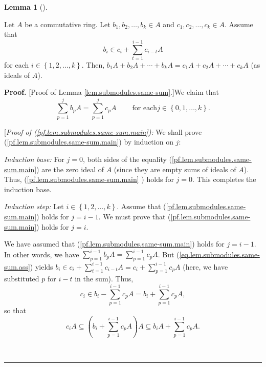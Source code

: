 \documentclass[numbers=enddot,12pt,final,onecolumn,notitlepage]{scrartcl}%
\theoremstyle{definition}
\newtheorem{lem}[theo]{Lemma}
\newenvironment{lemma}[1][]
{\begin{lem}[#1]\begin{leftbar}}
{\end{leftbar}\end{lem}}
\newenvironment{proof}[1][Proof]{\noindent\textbf{#1.} }{\ \rule{0.5em}{0.5em}}
\let\sumnonlimits\sum
\renewcommand{\sum}{\sumnonlimits\limits}
\begin{document}
\begin{lemma}
\label{lem.submodules.same-sum}Let $A$ be a commutative ring. Let $b_{1}%
,b_{2},\ldots,b_{k}\in A$ and $c_{1},c_{2},\ldots,c_{k}\in A$. Assume that
\begin{equation}
b_{i}\in c_{i}+\sum_{t=1}^{i-1}c_{i-t}A \label{eq.lem.submodules.same-sum.ass}%
\end{equation}
for each $i\in\left\{  1,2,\ldots,k\right\}  $. Then, $b_{1}A+b_{2}%
A+\cdots+b_{k}A=c_{1}A+c_{2}A+\cdots+c_{k}A$ (as ideals of $A$).
\end{lemma}

\begin{proof}
[Proof of Lemma \ref{lem.submodules.same-sum}.]We claim that%
\begin{equation}
\sum_{p=1}^{j}b_{p}A=\sum_{p=1}^{j}c_{p}A\ \ \ \ \ \ \ \ \ \ \text{for each
}j\in\left\{  0,1,\ldots,k\right\}  . \label{pf.lem.submodules.same-sum.main}%
\end{equation}


[\textit{Proof of (\ref{pf.lem.submodules.same-sum.main}):} We shall prove
(\ref{pf.lem.submodules.same-sum.main}) by induction on $j$:

\textit{Induction base:} For $j=0$, both sides of the equality
(\ref{pf.lem.submodules.same-sum.main}) are the zero ideal of $A$ (since they
are empty sums of ideals of $A$). Thus, (\ref{pf.lem.submodules.same-sum.main}%
) holds for $j=0$. This completes the induction base.

\textit{Induction step:} Let $i\in\left\{  1,2,\ldots,k\right\}  $. Assume
that (\ref{pf.lem.submodules.same-sum.main}) holds for $j=i-1$. We must prove
that (\ref{pf.lem.submodules.same-sum.main}) holds for $j=i$.

We have assumed that (\ref{pf.lem.submodules.same-sum.main}) holds for
$j=i-1$. In other words, we have $\sum_{p=1}^{i-1}b_{p}A=\sum_{p=1}^{i-1}%
c_{p}A$. But (\ref{eq.lem.submodules.same-sum.ass}) yields $b_{i}\in
c_{i}+\sum_{t=1}^{i-1}c_{i-t}A=c_{i}+\sum_{p=1}^{i-1}c_{p}A$ (here, we have
substituted $p$ for $i-t$ in the sum). Thus,
\[
c_{i}\in b_{i}-\sum_{p=1}^{i-1}c_{p}A=b_{i}+\sum_{p=1}^{i-1}c_{p}A,
\]
so that%
\[
c_{i}A\subseteq\left(  b_{i}+\sum_{p=1}^{i-1}c_{p}A\right)  A\subseteq
b_{i}A+\sum_{p=1}^{i-1}c_{p}A.
\]



\end{proof}
\end{document}
